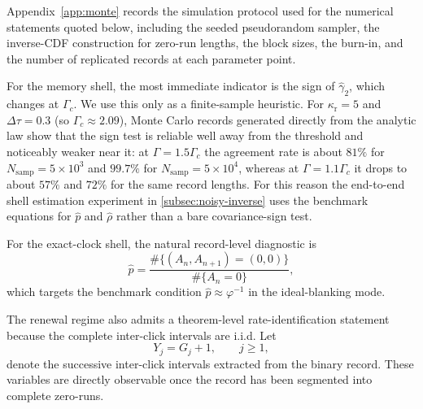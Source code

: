 \documentclass[11pt]{article}
\theoremstyle{definition}
\begin{document}
Appendix~\ref{app:monte} records the simulation protocol used for the numerical statements quoted below, including the seeded pseudorandom sampler, the inverse-CDF construction for zero-run lengths, the block sizes, the burn-in, and the number of replicated records at each parameter point.

For the memory shell, the most immediate indicator is the sign of $\widehat\gamma_2$, which changes at $\Gamma_c$. We use this only as a finite-sample heuristic. For $\kappa_{\mathrm r}=5$ and $\Delta\tau=0.3$ (so $\Gamma_c\approx2.09$), Monte Carlo records generated directly from the analytic law show that the sign test is reliable well away from the threshold and noticeably weaker near it: at $\Gamma=1.5\Gamma_c$ the agreement rate is about $81\%$ for $N_{\mathrm{samp}}=5\times10^3$ and $99.7\%$ for $N_{\mathrm{samp}}=5\times10^4$, whereas at $\Gamma=1.1\Gamma_c$ it drops to about $57\%$ and $72\%$ for the same record lengths. For this reason the end-to-end shell estimation experiment in \cref{subsec:noisy-inverse} uses the benchmark equations for $\widehat p$ and $\widehat\rho$ rather than a bare covariance-sign test.

For the exact-clock shell, the natural record-level diagnostic is
\[
\widehat p=\frac{\#\{(A_n,A_{n+1})=(0,0)\}}{\#\{A_n=0\}},
\]
which targets the benchmark condition $\widehat p\approx\varphi^{-1}$ in the ideal-blanking mode.

The renewal regime also admits a theorem-level rate-identification statement because the complete inter-click intervals are i.i.d. Let
\[
Y_j=G_j+1,\qquad j\ge1,
\]
denote the successive inter-click intervals extracted from the binary record. These variables are directly observable once the record has been segmented into complete zero-runs.
\end{document}
